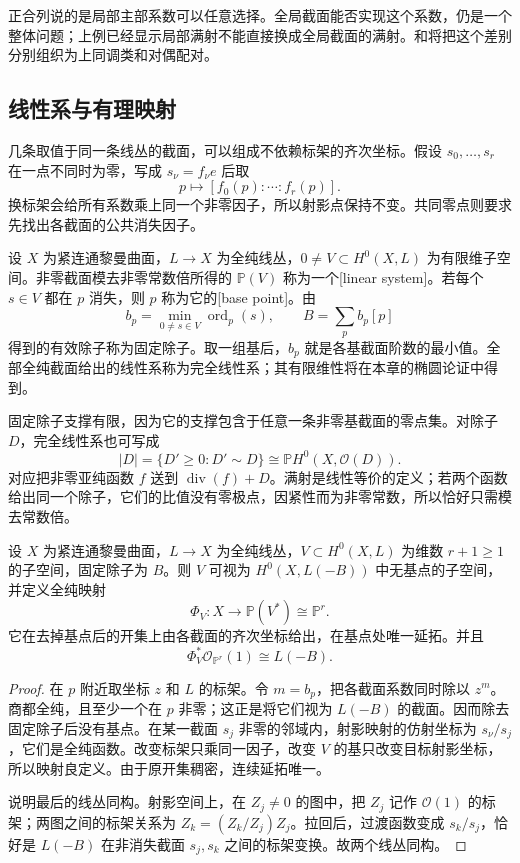 正合列说的是局部主部系数可以任意选择。全局截面能否实现这个系数，仍是一个整体问题；上例已经显示局部满射不能直接换成全局截面的满射。和将把这个差别分别组织为上同调类和对偶配对。

\subsection{线性系与有理映射}
\label{g4:subsec:0301:04}

几条取值于同一条线丛的截面，可以组成不依赖标架的齐次坐标。假设 \(s_0,\ldots,s_r\) 在一点不同时为零，写成 \(s_\nu=f_\nu e\) 后取
\[
	p\longmapsto[f_0(p):\cdots:f_r(p)].
\]
换标架会给所有系数乘上同一个非零因子，所以射影点保持不变。共同零点则要求先找出各截面的公共消失因子。

\begin{definition}\label{g4:def:0301:linear-system}
	设 \(X\) 为紧连通黎曼曲面，\(L\to X\) 为全纯线丛，\(0\ne V\subset H^0(X,L)\) 为有限维子空间。非零截面模去非零常数倍所得的 \(\mathbb P(V)\) 称为一个[linear system]。若每个 \(s\in V\) 都在 \(p\) 消失，则 \(p\) 称为它的[base point]。由
	\[
		b_p=\min_{0\ne s\in V}\operatorname{ord}_p(s),
		\qquad B=\sum_p b_p[p]
	\]
	得到的有效除子称为固定除子。取一组基后，\(b_p\) 就是各基截面阶数的最小值。全部全纯截面给出的线性系称为完全线性系；其有限维性将在本章的椭圆论证中得到。
\end{definition}

固定除子支撑有限，因为它的支撑包含于任意一条非零基截面的零点集。对除子 \(D\)，完全线性系也可写成
\[
	|D|=\{D'\ge0:D'\sim D\}
	\cong\mathbb P H^0(X,\mathcal O(D)).
\]
对应把非零亚纯函数 \(f\) 送到 \(\operatorname{div}(f)+D\)。满射是线性等价的定义；若两个函数给出同一个除子，它们的比值没有零极点，因紧性而为非零常数，所以恰好只需模去常数倍。

\begin{proposition}\label{g4:prop:0301:linear-system-map}
	设 \(X\) 为紧连通黎曼曲面，\(L\to X\) 为全纯线丛，\(V\subset H^0(X,L)\) 为维数 \(r+1\ge1\) 的子空间，固定除子为 \(B\)。则 \(V\) 可视为 \(H^0(X,L(-B))\) 中无基点的子空间，并定义全纯映射
	\[
		\Phi_V:X\longrightarrow\mathbb P(V^*)\cong\mathbb P^r.
	\]
	它在去掉基点后的开集上由各截面的齐次坐标给出，在基点处唯一延拓。并且
	\[
		\Phi_V^*\mathcal O_{\mathbb P^r}(1)\cong L(-B).
	\]
\end{proposition}
\begin{proof}
	在 \(p\) 附近取坐标 \(z\) 和 \(L\) 的标架。令 \(m=b_p\)，把各截面系数同时除以 \(z^m\)。商都全纯，且至少一个在 \(p\) 非零；这正是将它们视为 \(L(-B)\) 的截面。因而除去固定除子后没有基点。在某一截面 \(s_j\) 非零的邻域内，射影映射的仿射坐标为 \(s_\nu/s_j\)，它们是全纯函数。改变标架只乘同一因子，改变 \(V\) 的基只改变目标射影坐标，所以映射良定义。由于原开集稠密，连续延拓唯一。

	说明最后的线丛同构。射影空间上，在 \(Z_j\ne0\) 的图中，把 \(Z_j\) 记作 \(\mathcal O(1)\) 的标架；两图之间的标架关系为 \(Z_k=(Z_k/Z_j)Z_j\)。拉回后，过渡函数变成 \(s_k/s_j\)，恰好是 \(L(-B)\) 在非消失截面 \(s_j,s_k\) 之间的标架变换。故两个线丛同构。
\end{proof}

